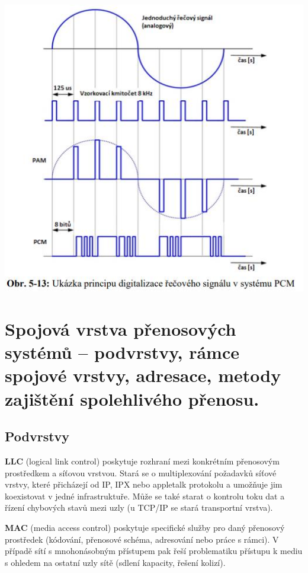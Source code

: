 \begin{center}
    \includegraphics[scale=0.75]{images/-022.jpg}
\end{center}

\clearpage
\section{Spojová vrstva přenosových systémů -- podvrstvy, rámce spojové vrstvy, adresace, metody zajištění spolehlivého přenosu.}

\subsection{Podvrstvy}

\textbf{LLC} (logical link control) poskytuje rozhraní mezi konkrétním přenosovým prostředkem a síťovou vrstvou. Stará se o multiplexování požadavků síťové vrstvy, které přicházejí od IP, IPX nebo appletalk protokolu a umožňuje jim koexistovat v jedné infrastruktuře. Může se také starat o kontrolu toku dat a řízení chybových stavů mezi uzly (u TCP/IP se stará transportní vrstva).

\textbf{MAC} (media access control) poskytuje specifické služby pro daný přenosový prostředek (kódování, přenosové schéma, adresování nebo práce s rámci). V případě sítí s mnohonásobným přístupem pak řeší problematiku přístupu k mediu s ohledem na ostatní uzly sítě (sdlení kapacity, řešení kolizí).

